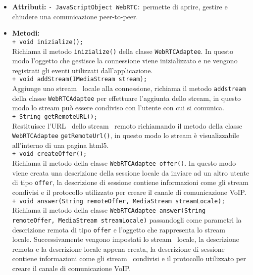 {{\begin{sloppypar}
{{{\begin{itemize}
				\item[] \textbf{Attributi:}
					\texttt{- JavaScriptObject WebRTC:} permette di aprire, gestire e chiudere una comunicazione peer-to-peer\g.\\
			
				\item[] \textbf{Metodi:}{\\
					\texttt{+ void inizialize();}\\
					Richiama il metodo \texttt{inizialize()} della classe \texttt{WebRTCAdaptee}. In questo modo l'oggetto che gestisce la connessione viene inizializzato e ne vengono registrati gli eventi utilizzati dall'applicazione.\\
					
					\texttt{+ void addStream(IMediaStream stream);}\\
					Aggiunge uno stream\g~ locale alla connessione, richiama il metodo \texttt{addstream} della classe \texttt{WebRTCAdaptee} per effettuare l'aggiunta dello stream\g, in questo modo lo stream può essere condiviso con l'utente con cui si comunica.\\
					
					\texttt{+ String getRemoteURL();}\\
					Restituisce l'URL\g~ dello stream\g~ remoto richiamando il metodo della classe \texttt{WebRTCAdaptee} \texttt{getRemoteUrl()}, in questo modo lo stream è visualizzabile all'interno di una pagina html5.\\
					
					\texttt{+ void createOffer();}\\
					Richiama il metodo della classe \texttt{WebRTCAdaptee offer()}. In questo modo viene creata una descrizione della sessione locale da inviare ad un altro utente di tipo \texttt{offer}, la descrizione di sessione contiene informazioni come gli stream condivisi e il protocollo utilizzato per creare il canale di comunicazione VoIP.\\
					
					\texttt{+ void answer(String remoteOffer, MediaStream streamLocale);}\\
					Richiama il metodo della classe \texttt{WebRTCAdaptee answer(String remoteOffer, MediaStream streamLocale)} passandogli come parametri la descrizione remota di tipo \texttt{offer} e l'oggetto che rappresenta lo stream\g~ locale. Successivamente vengono impostati lo stream\g~ locale, la descrizione remota e la descrizione locale appena creata, la descrizione di sessione contiene informazioni come gli stream\g~ condivisi e il protocollo utilizzato per creare il canale di comunicazione VoIP.\\

}
\end{itemize}}}}
\end{sloppypar}}}
